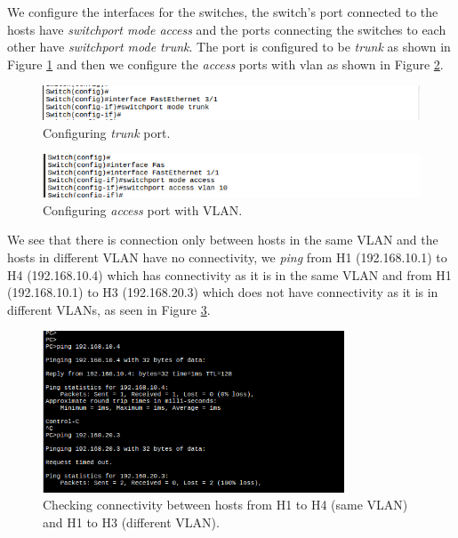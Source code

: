 \documentclass{article}
\begin{document}
We configure the interfaces for the switches, the switch's port connected to the hosts have \textit{switchport mode access} and the ports connecting the switches to each other have \textit{switchport mode trunk}. The port is configured to be \textit{trunk} as shown in Figure \ref{fig:1trunkconf} and then we configure the \textit{access} ports with vlan as shown in Figure \ref{fig:1accessconf}.

\begin{figure}[h]
    \centering
    \includegraphics[width=\textwidth]{1trunkconf}
    \caption{Configuring \textit{trunk} port.}
    \label{fig:1trunkconf}
\end{figure}

\begin{figure}[h]
    \centering
    \includegraphics[width=\textwidth]{1accessconf}
    \caption{Configuring \textit{access} port with VLAN.}
    \label{fig:1accessconf}
\end{figure}

We see that there is connection only between hosts in the same VLAN and the hosts in different VLAN have no connectivity, we \textit{ping} from H1 (192.168.10.1) to H4 (192.168.10.4) which has connectivity as it is in the same VLAN and from H1 (192.168.10.1) to H3 (192.168.20.3) which does not have connectivity as it is in different VLANs, as seen in Figure \ref{fig:1ping}. 

\begin{figure}[h]
    \centering
    \includegraphics[scale=0.4,width=0.8\textwidth]{1ping}
    \caption{Checking connectivity between hosts from H1 to H4 (same VLAN) and H1 to H3 (different VLAN).}
    \label{fig:1ping}
\end{figure}
\end{document}
